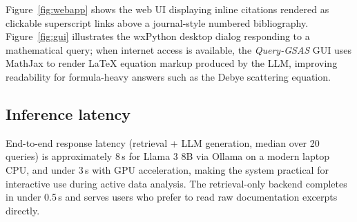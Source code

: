 Figure~\ref{fig:webapp} shows the web UI displaying inline citations
rendered as clickable superscript links above a journal-style
numbered bibliography.
Figure~\ref{fig:gui} illustrates the wxPython desktop dialog responding
to a mathematical query; when internet access is available, the
\textit{Query-GSAS} GUI uses MathJax to render \LaTeX{} equation markup
produced by the LLM, improving readability for formula-heavy answers
such as the Debye scattering equation.

\subsection{Inference latency}

End-to-end response latency (retrieval + LLM generation, median over 20 queries)
is approximately 8\,s for Llama 3 8B via Ollama on a modern laptop CPU,
and under 3\,s with GPU acceleration, making the system practical for
interactive use during active data analysis.
The retrieval-only backend completes in under 0.5\,s and serves users
who prefer to read raw documentation excerpts directly.
